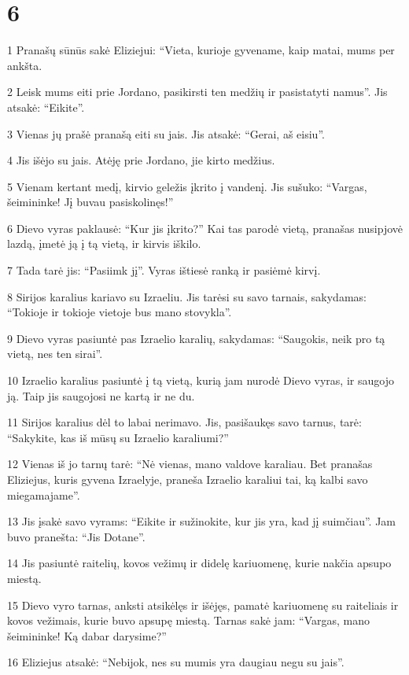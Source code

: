 \chapter{6}

\par 1 Pranašų sūnūs sakė Eliziejui: “Vieta, kurioje gyvename, kaip matai, mums per ankšta. 
\par 2 Leisk mums eiti prie Jordano, pasikirsti ten medžių ir pasistatyti namus”. Jis atsakė: “Eikite”. 
\par 3 Vienas jų prašė pranašą eiti su jais. Jis atsakė: “Gerai, aš eisiu”. 
\par 4 Jis išėjo su jais. Atėję prie Jordano, jie kirto medžius. 
\par 5 Vienam kertant medį, kirvio geležis įkrito į vandenį. Jis sušuko: “Vargas, šeimininke! Jį buvau pasiskolinęs!” 
\par 6 Dievo vyras paklausė: “Kur jis įkrito?” Kai tas parodė vietą, pranašas nusipjovė lazdą, įmetė ją į tą vietą, ir kirvis iškilo. 
\par 7 Tada tarė jis: “Pasiimk jį”. Vyras ištiesė ranką ir pasiėmė kirvį. 
\par 8 Sirijos karalius kariavo su Izraeliu. Jis tarėsi su savo tarnais, sakydamas: “Tokioje ir tokioje vietoje bus mano stovykla”. 
\par 9 Dievo vyras pasiuntė pas Izraelio karalių, sakydamas: “Saugokis, neik pro tą vietą, nes ten sirai”. 
\par 10 Izraelio karalius pasiuntė į tą vietą, kurią jam nurodė Dievo vyras, ir saugojo ją. Taip jis saugojosi ne kartą ir ne du. 
\par 11 Sirijos karalius dėl to labai nerimavo. Jis, pasišaukęs savo tarnus, tarė: “Sakykite, kas iš mūsų su Izraelio karaliumi?” 
\par 12 Vienas iš jo tarnų tarė: “Nė vienas, mano valdove karaliau. Bet pranašas Eliziejus, kuris gyvena Izraelyje, praneša Izraelio karaliui tai, ką kalbi savo miegamajame”. 
\par 13 Jis įsakė savo vyrams: “Eikite ir sužinokite, kur jis yra, kad jį suimčiau”. Jam buvo pranešta: “Jis Dotane”. 
\par 14 Jis pasiuntė raitelių, kovos vežimų ir didelę kariuomenę, kurie nakčia apsupo miestą. 
\par 15 Dievo vyro tarnas, anksti atsikėlęs ir išėjęs, pamatė kariuomenę su raiteliais ir kovos vežimais, kurie buvo apsupę miestą. Tarnas sakė jam: “Vargas, mano šeimininke! Ką dabar darysime?” 
\par 16 Eliziejus atsakė: “Nebijok, nes su mumis yra daugiau negu su jais”. 
